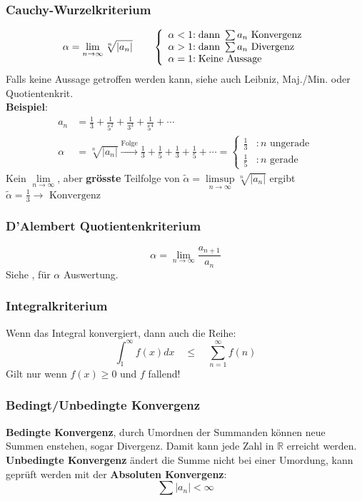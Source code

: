 \subsubsection{Cauchy-Wurzelkriterium}\label{W-Kriterium}
\[\alpha = \lim\limits_{n \rightarrow \infty}{\sqrt[n]{\left|a_n\right|}}\qquad
\left\lbrace
\begin{array}{r@{}l}
	\alpha < 1 &: \text{dann } \sum a_n \text{ Konvergenz} \\
	\alpha > 1 &: \text{dann } \sum a_n \text{ Divergenz} \\
	\alpha = 1 &: \text{Keine Aussage} \\
\end{array}\right. \]
Falls keine Aussage getroffen werden kann, siehe auch Leibniz, Maj./Min. oder Quotientenkrit.
\\
\noindent\textbf{Beispiel}:
\begin{align*}
	a_n &= \frac{1}{3} + \frac{1}{5^2} + \frac{1}{3^3} + \frac{1}{5^4} + \cdots \\
	\alpha &= \sqrt[n]{\left|a_n\right|} \xrightarrow{\text{Folge}} \frac{1}{3} + \frac{1}{5} + \frac{1}{3} + \frac{1}{5} + \cdots = \begin{cases}
		\tfrac{1}{3} &: n \text{ ungerade} \\
		\tfrac{1}{5} &: n \text{ gerade}
	\end{cases}  
\end{align*}
Kein $\lim\limits_{n\rightarrow\infty}$, aber \textbf{grösste} Teilfolge von $\tilde{\alpha} = \limsup\limits_{n\rightarrow\infty}\sqrt[n]{\left|a_n\right|}$ ergibt $\tilde{\alpha} = \tfrac{1}{3} \rightarrow \text{ Konvergenz}$

\subsubsection{D'Alembert Quotientenkriterium}
\[\alpha = \lim\limits_{n \rightarrow \infty}{\frac{a_{n+1}}{a_n}}\]
Siehe , für $\alpha$ Auswertung.

\subsubsection{Integralkriterium}
Wenn das Integral konvergiert, dann auch die Reihe:
\[\int_{1}^{\infty}f(x)dx \quad\leq\quad \sum_{n=1}^{\infty}f(n)\]
Gilt nur wenn $f(x) \geq 0$ und $f$ fallend!

\subsubsection{Bedingt/Unbedingte Konvergenz}
\textbf{Bedingte Konvergenz}, durch Umordnen der Summanden können neue Summen enstehen, sogar Divergenz. Damit kann jede Zahl in $\mathbb{R}$ erreicht werden.\\
\textbf{Unbedingte Konvergenz} ändert die Summe nicht bei einer Umordung, kann geprüft werden mit der \textbf{Absoluten Konvergenz}:
\[\sum\left|a_n\right| < \infty\]

